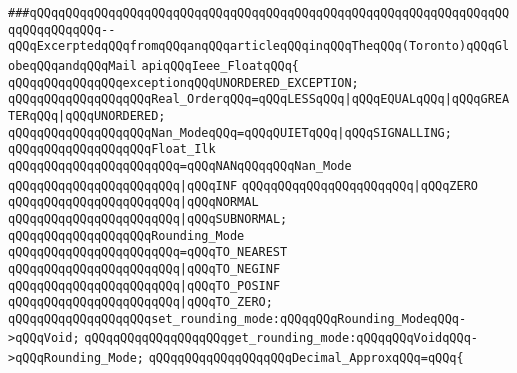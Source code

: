 \verb|###qQQqqQQqqQQqqQQqqQQqqQQqqQQqqQQqqQQqqQQqqQQqqQQqqQQqqQQqqQQqqQQqqQQqqQQqqQQqqQQq--qQQqExcerptedqQQqfromqQQqanqQQqarticleqQQqinqQQqTheqQQq(Toronto)qQQqGlobeqQQqandqQQqMail|\newline
\newline
\newline
\newline
\verb|apiqQQqIeee_FloatqQQq{|\newline
\newline
\verb|qQQqqQQqqQQqqQQqexceptionqQQqUNORDERED_EXCEPTION;|\newline
\newline
\verb|qQQqqQQqqQQqqQQqqQQqReal_OrderqQQq=qQQqLESSqQQq|\verb#|qQQqEQUALqQQq|qQQqGREATERqQQq|qQQqUNORDERED;#\newline
\newline
\verb|qQQqqQQqqQQqqQQqqQQqNan_ModeqQQq=qQQqQUIETqQQq|\verb#|qQQqSIGNALLING;#\newline
\newline
\verb|qQQqqQQqqQQqqQQqqQQqFloat_Ilk|\newline
\verb|qQQqqQQqqQQqqQQqqQQqqQQq=qQQqNANqQQqqQQqNan_Mode|\newline
\verb|qQQqqQQqqQQqqQQqqQQqqQQq|\verb#|qQQqINF#\newline
\verb|qQQqqQQqqQQqqQQqqQQqqQQq|\verb#|qQQqZERO#\newline
\verb|qQQqqQQqqQQqqQQqqQQqqQQq|\verb#|qQQqNORMAL#\newline
\verb|qQQqqQQqqQQqqQQqqQQqqQQq|\verb#|qQQqSUBNORMAL;#\newline
\newline
\verb|qQQqqQQqqQQqqQQqqQQqRounding_Mode|\newline
\verb|qQQqqQQqqQQqqQQqqQQqqQQq=qQQqTO_NEAREST|\newline
\verb|qQQqqQQqqQQqqQQqqQQqqQQq|\verb#|qQQqTO_NEGINF#\newline
\verb|qQQqqQQqqQQqqQQqqQQqqQQq|\verb#|qQQqTO_POSINF#\newline
\verb|qQQqqQQqqQQqqQQqqQQqqQQq|\verb#|qQQqTO_ZERO;#\newline
\newline
\verb|qQQqqQQqqQQqqQQqqQQqset_rounding_mode:qQQqqQQqRounding_ModeqQQq->qQQqVoid;|\newline
\verb|qQQqqQQqqQQqqQQqqQQqget_rounding_mode:qQQqqQQqVoidqQQq->qQQqRounding_Mode;|\newline
\newline
\verb|qQQqqQQqqQQqqQQqqQQqDecimal_ApproxqQQq=qQQq{|\newline
